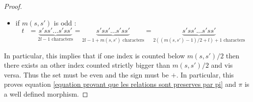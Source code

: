 \documentclass[envcountsame,envcountchap]{svmono}
\newcommand{\qq}{\text{ }}
\begin{document}
\begin{proof}
\begin{itemize}
			\item  if $ m(s,s')$ is odd :
			\begin{equation}
			t\qq=\underset{2l-1 \mbox{ characters}}{\underbrace{s'ss'...s'ss'}}=\underset{2l-1 +m(s,s') \mbox{ characters}}{\underbrace{s'ss'...s'ss'}}= \underset{2((m(s,s')-1)/2+l)+1 \mbox{ characters}}{\underbrace{s'ss'...s'ss'}} 
			\end{equation} 
		\end{itemize}
	In particular, this implies that if one index is counted below $m(s,s')/2$ then there exists an other index counted strictly bigger than $m(s,s')/2$ and vis versa. Thus the set must be even and the sign must be $+$. In particular, this proves equation \eqref{equation provant que les relations sont preserves par pi} and $\pi$ is a well defined morphism.
	

\end{proof}
\end{document}

